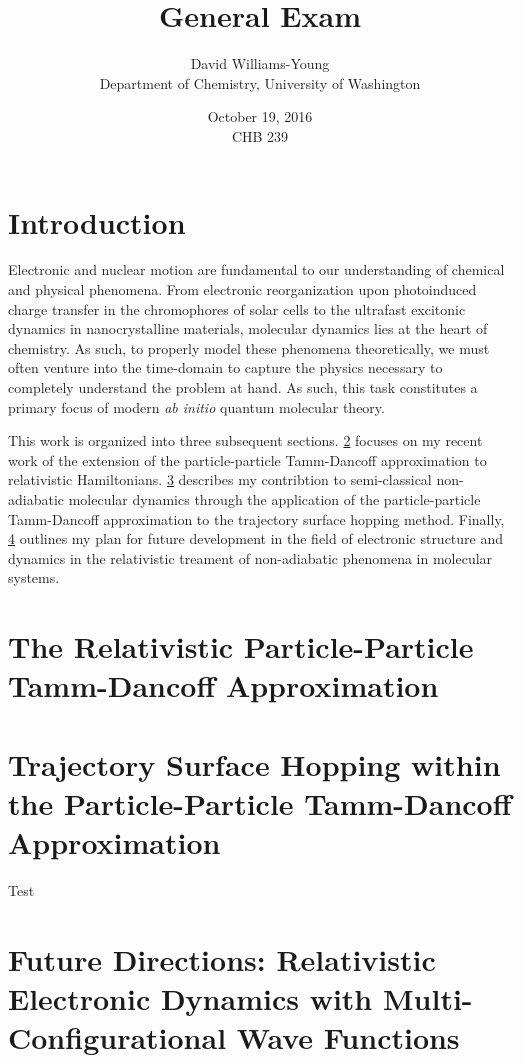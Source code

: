 \documentclass[12pt]{article}
\title{General Exam}
\date{October 19, 2016 \\ CHB 239}
\author{David Williams-Young\\ Department of Chemistry, University of Washington}
\begin{document}
\maketitle


\newpage
\section{Introduction}

Electronic and nuclear motion are fundamental to our understanding of chemical
and physical phenomena. From electronic reorganization upon photoinduced charge
transfer in the chromophores of solar cells to the ultrafast excitonic dynamics
in nanocrystalline materials, molecular dynamics lies at the heart of chemistry.
As such, to properly model these phenomena theoretically, we must often venture
into the time-domain to capture the physics necessary to completely understand
the problem at hand. As such, this task constitutes a primary focus of modern 
\emph{ab initio} quantum molecular theory.



This work is organized into three subsequent sections.
\cref{sec:pp-X2C} focuses on my recent work of the extension of the
particle-particle Tamm-Dancoff approximation to relativistic Hamiltonians.
\cref{sec:pp-TSH} describes my contribtion to semi-classical non-adiabatic
molecular dynamics through the application of the particle-particle Tamm-Dancoff
approximation to the trajectory surface hopping method.  Finally,
\cref{sec:Future} outlines my plan for future development in the field of
electronic structure and dynamics in the relativistic treament of non-adiabatic
phenomena in molecular systems.


\section{The Relativistic Particle-Particle Tamm-Dancoff Approximation}
\label{sec:pp-X2C}


\section{Trajectory Surface Hopping within the Particle-Particle Tamm-Dancoff Approximation}
\label{sec:pp-TSH}
Test\cite{Li16_pp-TSH}

\section{Future Directions: Relativistic Electronic Dynamics with Multi-Configurational Wave Functions}
\label{sec:Future}


\end{document}
